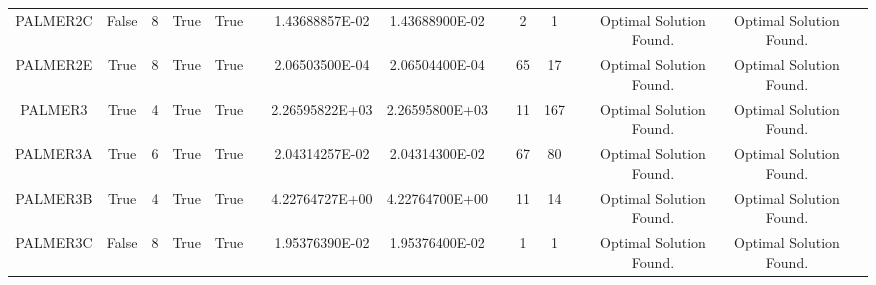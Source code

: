 \begin{longtable}{ccccccccccccccc}
	\cellcolor{default2} PALMER2C& \cellcolor{default2} False& \cellcolor{default2} 8& \cellcolor{default2} True& \cellcolor{default2} True& \cellcolor{header} & \cellcolor{best} 1.43688857E-02& \cellcolor{ok} 1.43688900E-02& \cellcolor{header} & \cellcolor{ok} 2& \cellcolor{best} 1& \cellcolor{header} & \cellcolor{default2} Optimal Solution Found.& \cellcolor{default2} Optimal Solution Found.& \cellcolor{header} \\
	\cellcolor{default1} PALMER2E& \cellcolor{default1} True& \cellcolor{default1} 8& \cellcolor{default1} True& \cellcolor{default1} True& \cellcolor{header} & \cellcolor{best} 2.06503500E-04& \cellcolor{ok} 2.06504400E-04& \cellcolor{header} & \cellcolor{poor} 65& \cellcolor{best} 17& \cellcolor{header} & \cellcolor{default1} Optimal Solution Found.& \cellcolor{default1} Optimal Solution Found.& \cellcolor{header} \\
	\cellcolor{default2} PALMER3& \cellcolor{default2} True& \cellcolor{default2} 4& \cellcolor{default2} True& \cellcolor{default2} True& \cellcolor{header} & \cellcolor{ok} 2.26595822E+03& \cellcolor{best} 2.26595800E+03& \cellcolor{header} & \cellcolor{best} 11& \cellcolor{poor} 167& \cellcolor{header} & \cellcolor{default2} Optimal Solution Found.& \cellcolor{default2} Optimal Solution Found.& \cellcolor{header} \\
	\cellcolor{default1} PALMER3A& \cellcolor{default1} True& \cellcolor{default1} 6& \cellcolor{default1} True& \cellcolor{default1} True& \cellcolor{header} & \cellcolor{best} 2.04314257E-02& \cellcolor{ok} 2.04314300E-02& \cellcolor{header} & \cellcolor{best} 67& \cellcolor{ok} 80& \cellcolor{header} & \cellcolor{default1} Optimal Solution Found.& \cellcolor{default1} Optimal Solution Found.& \cellcolor{header} \\
	\cellcolor{default2} PALMER3B& \cellcolor{default2} True& \cellcolor{default2} 4& \cellcolor{default2} True& \cellcolor{default2} True& \cellcolor{header} & \cellcolor{ok} 4.22764727E+00& \cellcolor{best} 4.22764700E+00& \cellcolor{header} & \cellcolor{best} 11& \cellcolor{ok} 14& \cellcolor{header} & \cellcolor{default2} Optimal Solution Found.& \cellcolor{default2} Optimal Solution Found.& \cellcolor{header} \\
	\cellcolor{default1} PALMER3C& \cellcolor{default1} False& \cellcolor{default1} 8& \cellcolor{default1} True& \cellcolor{default1} True& \cellcolor{header} & \cellcolor{best} 1.95376390E-02& \cellcolor{ok} 1.95376400E-02& \cellcolor{header} & \cellcolor{best} 1& \cellcolor{best} 1& \cellcolor{header} & \cellcolor{default1} Optimal Solution Found.& \cellcolor{default1} Optimal Solution Found.& \cellcolor{header} \\

\end{longtable}
